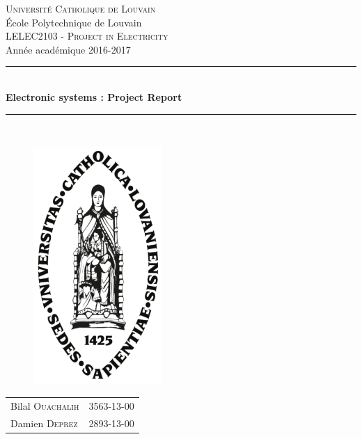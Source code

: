 \documentclass[a4paper, 12pt]{report}
\begin{document}
\begin{titlepage}
\newcommand{\HRule}{\rule{\linewidth}{0.5mm}} 
\center 

\textsc{\Large Universit\'e Catholique de Louvain}\\[0,25cm]
{\large \'Ecole Polytechnique de Louvain}\\[0,5cm]
\textsc{\LARGE LELEC2103 - Project in Electricity }\\[0.35cm]
{\large Ann\'ee acad\'emique 2016-2017}\\[0,5cm] 

\HRule \\[0.4cm]
{ \huge \bfseries Electronic systems : Project Report }\\ [0.5cm] %
\HRule \\[0.1cm] %

\begin{figure}[ht]
\centering
\includegraphics [height=9cm] {img/ucl}
\end{figure}

\begin{minipage}{0.7\textwidth}
\begin{center}
\begin{tabular}{lc}
Bilal \textsc{Ouachalih} & 3563-13-00\\
Damien \textsc{Deprez} & 2893-13-00 \\
\end{tabular}
\end{center}
\end{minipage}\\[0.6cm]


\end{titlepage}
\end{document}
